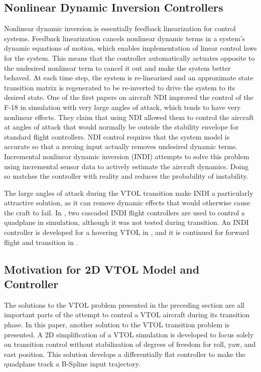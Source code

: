 \subsection{Nonlinear Dynamic Inversion Controllers}

Nonlinear dynamic inversion is essentially feedback linearization for control systems.
Feedback linearization cancels nonlinear dynamic terms in a system's dynamic equations of motion, which enables implementation of linear control laws for the system.
This means that the controller automatically actuates opposite to the undesired nonlinear term to cancel it out and make the system better behaved. 
At each time step, the system is re-linearized and an approximate state transition matrix is regenerated to be re-inverted to drive the system to its desired state.
One of the first papers on aircraft NDI \cite{ndi_firstPaper} improved the control of the F-18 in simulation with very large angles of attack,  which tends to have very nonlinear effects.
They claim that using NDI allowed them to control the aircraft at angles of attack that would normally be outside the stability envelope for standard flight controllers.
NDI control requires that the system model is accurate so that a zeroing input actually removes undesired dynamic terms.
Incremental nonlinear dynamic inversion (INDI) attempts to solve this problem using incremental sensor data to actively estimate the aircraft dynamics. 
Doing so matches the controller with reality and reduces the probability of instability.

The large angles of attack during the VTOL transition make INDI a particularly attractive solution, as it can remove dynamic effects that would otherwise cause the craft to fail.
In \cite{incremental_nonlinear_dynamic_inversion}, two cascaded INDI flight controllers are used to control a quadplane in simulation, although it was not tested during transition.
An INDI controller is developed for a hovering VTOL in \cite{nasa_hover}, and it is continued for forward flight and transition in \cite{nasa_hover_2}.

\subsection{Motivation for 2D VTOL Model and Controller}

The solutions to the VTOL problem presented in the preceding section are all important parts of the attempt to control a VTOL aircraft during its transition phase.
In this paper, another solution to the VTOL transition problem is presented.
A 2D simplification of a VTOL simulation is developed to focus solely on transition control without stabilization of degrees of freedom for roll, yaw, and east position.
This solution develops a differentially flat controller to make the quadplane track a B-Spline input trajectory.

